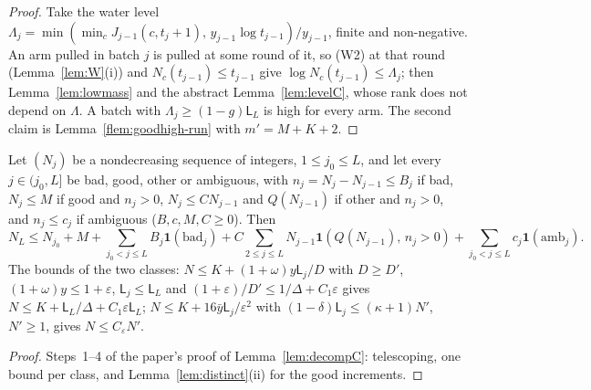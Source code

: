 \documentclass[11pt]{article}
\begin{document}
\begin{proof}
Take the water level $\Lambda_j=\min(\min_cJ_{j-1}(c,t_j+1),\,y_{j-1}\log t_{j-1})/y_{j-1}$, finite and
non-negative. An arm pulled in batch $j$ is pulled at some round of it, so (W2) at that round
(Lemma~\ref{lem:W}(i)) and $N_c(t_{j-1})\le t_{j-1}$ give $\log N_c(t_{j-1})\le\Lambda_j$; then
Lemma~\ref{lem:lowmass} and the abstract Lemma~\ref{lem:levelC}, whose rank does not depend on
$\Lambda$. A batch with $\Lambda_j\ge(1-g)\mathsf L_L$ is high for every arm. The second claim is
Lemma~\ref{flem:goodhigh-run} with $m'=M+K+2$.
\end{proof}

\begin{lemma}[the decomposition when $x=1$, abstract form]\label{flem:decompC-abstract}
\uses{}
Let $(N_j)$ be a nondecreasing sequence of integers, $1\le j_0\le L$, and let every $j\in(j_0,L]$
be bad, good, other or ambiguous, with $n_j=N_j-N_{j-1}\le B_j$ if bad, $N_j\le M$ if good and
$n_j>0$, $N_j\le CN_{j-1}$ and $Q(N_{j-1})$ if other and $n_j>0$, and $n_j\le c_j$ if ambiguous
($B,c,M,C\ge0$). Then
\[
N_L\le N_{j_0}+M+\sum_{j_0<j\le L}B_j\mathbf 1(\text{bad}_j)
+C\sum_{2\le j\le L}N_{j-1}\mathbf 1(Q(N_{j-1}),\,n_j>0)+\sum_{j_0<j\le L}c_j\mathbf 1(\text{amb}_j).
\]
The bounds of the two classes: $N\le K+(1+\omega)y\mathsf L_j/D$ with $D\ge D'$, $(1+\omega)y\le1+\varepsilon$, $\mathsf L_j\le\mathsf L_L$ and
$(1+\varepsilon)/D'\le1/\Delta+C_1\varepsilon$ gives $N\le K+\mathsf L_L/\Delta+C_1\varepsilon\mathsf L_L$; $N\le K+16\bar y\mathsf L_j/\varepsilon^2$ with
$(1-\delta)\mathsf L_j\le(\kappa+1)N'$, $N'\ge1$, gives $N\le C_\varepsilon N'$.
\end{lemma}

\begin{proof}
Steps~1--4 of the paper's proof of Lemma~\ref{lem:decompC}: telescoping, one bound per class, and
Lemma~\ref{lem:distinct}(ii) for the good increments.
\end{proof}
\end{document}
